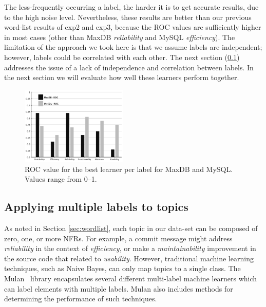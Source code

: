 \documentclass[]{sig-alternate}
\begin{document}
The less-frequently occurring a label, the harder it is to get accurate
results, due to the high noise level. Nevertheless, these results are
better than our previous word-list results of \textsf{exp2} and
\textsf{exp3}, because the ROC values are sufficiently higher in most
cases (other than MaxDB \emph{reliability} and MySQL \emph{efficiency}). The
limitation of the approach we took here is that we assume labels are
independent; however, labels could be correlated with each other. 
The next section (\ref{sec:multilabel})
addresses the issue of a lack of independence and correlation between labels.
In the next section we will evaluate how well these learners perform
together.

\begin{figure}
\centering
\includegraphics[width=0.45\textwidth]{figures/both-supervised}
\caption[]{ROC value for the best learner per label for MaxDB and MySQL. Values range from 0--1.
}
\label{fig:best-learn-per-tag}
\end{figure}

\subsection{Applying multiple labels to topics}
\label{sec:multilabel}

As noted in Section \ref{sec:wordlist}, each topic in our data-set can be composed of zero, one, or more NFRs. 
For example, a commit message might address \textit{reliability} in the context of \textit{efficiency}, or make a \textit{maintainability} improvement in the source code that related to \textit{usability}. 
However, traditional machine learning techniques, such as Naive Bayes, can only map topics to a single class. 
The Mulan~\cite{mulan} library encapsulates several different multi-label machine learners which can label elements with multiple labels.
Mulan also includes methods for determining the performance of such techniques.
\end{document}
